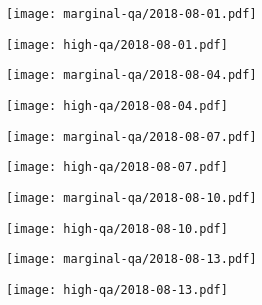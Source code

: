 \documentclass{article}
\begin{document}
\begin{figure}[H]
	\ContinuedFloat
	\centering
	\begin{subfigure}{0.48\linewidth}
		\texttt{[image: marginal-qa/2018-08-01.pdf]}
	\end{subfigure}
	\begin{subfigure}{0.48\linewidth}
		\texttt{[image: high-qa/2018-08-01.pdf]}
	\end{subfigure}
	\begin{subfigure}{0.48\linewidth}
		\texttt{[image: marginal-qa/2018-08-04.pdf]}
	\end{subfigure}
	\begin{subfigure}{0.48\linewidth}
		\texttt{[image: high-qa/2018-08-04.pdf]}
	\end{subfigure}
	\begin{subfigure}{0.48\linewidth}
		\texttt{[image: marginal-qa/2018-08-07.pdf]}
	\end{subfigure}
	\begin{subfigure}{0.48\linewidth}
		\texttt{[image: high-qa/2018-08-07.pdf]}
	\end{subfigure}
	\begin{subfigure}{0.48\linewidth}
		\texttt{[image: marginal-qa/2018-08-10.pdf]}
	\end{subfigure}
	\begin{subfigure}{0.48\linewidth}
		\texttt{[image: high-qa/2018-08-10.pdf]}
	\end{subfigure}
	\begin{subfigure}{0.48\linewidth}
		\texttt{[image: marginal-qa/2018-08-13.pdf]}
	\end{subfigure}
	\begin{subfigure}{0.48\linewidth}
		\texttt{[image: high-qa/2018-08-13.pdf]}
	\end{subfigure}
\end{figure}
\end{document}
